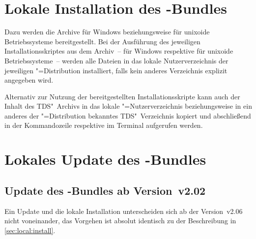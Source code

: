 \section{%
  Lokale Installation des \TUDScript-Bundles%
  \label{sec:local:install}%
}

Dazu werden die Archive  
für Windows beziehungsweise 
für unixoide Betriebssysteme bereitgestellt. Bei der Ausführung des jeweiligen 
Installationsskriptes aus dem Archiv~-- 
für Windows respektive  für unixoide 
Betriebssysteme~-- werden alle Dateien in das lokale Nutzerverzeichnis der 
jeweiligen "=Distribution installiert, falls kein anderes 
Verzeichnis explizit angegeben wird. 


Alternativ zur Nutzung der bereitgestellten Installationsskripte kann auch der 
Inhalt des TDS"~Archivs  in das lokale 
"=Nutzerverzeichnis beziehungsweise in ein anderes der 
"=Distribution bekanntes TDS"~Verzeichnis kopiert und 
abschließend in der Kommandozeile respektive im Terminal  
aufgerufen werden. 



\section{%
  Lokales Update des \TUDScript-Bundles%
  \label{sec:local:update}%
}
\subsection{Update des \TUDScript-Bundles ab Version~v2.02}
%
Ein Update und die lokale Installation unterscheiden sich ab der Version~v2.06 
nicht voneinander, das Vorgehen ist absolut identisch zu der Beschreibung in 
\autoref{sec:local:install}.



